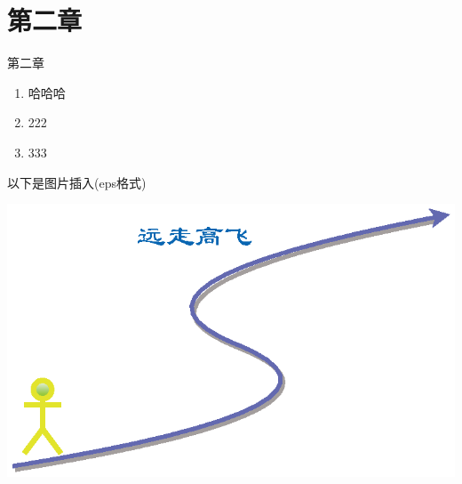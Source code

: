 \section{第二章}
第二章
\begin{enumerate}
    \item 哈哈哈
    \item 222
    \item 333
\end{enumerate}
以下是图片插入(eps格式)
\begin{center}
    \includegraphics[scale=1]{Pic.drawio.eps}
\end{center}
